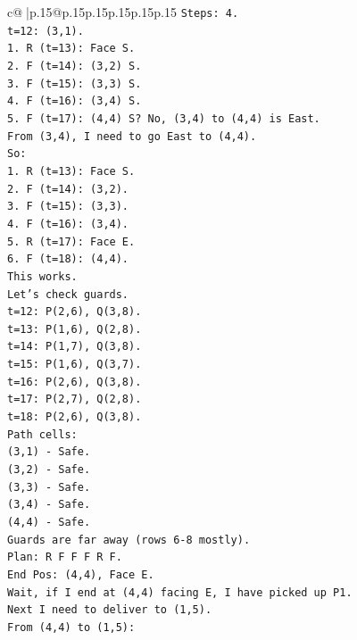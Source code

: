 \documentclass{article}
\begin{document}
{\begin{supertabular}{c@{$\;$}|p{.15\linewidth}@{}p{.15\linewidth}p{.15\linewidth}p{.15\linewidth}p{.15\linewidth}p{.15\linewidth}}
{{{\texttt{Steps: 4.} \\
\texttt{t=12: (3,1).} \\
\texttt{1. R (t=13): Face S.} \\
\texttt{2. F (t=14): (3,2) S.} \\
\texttt{3. F (t=15): (3,3) S.} \\
\texttt{4. F (t=16): (3,4) S.} \\
\texttt{5. F (t=17): (4,4) S? No, (3,4) to (4,4) is East.} \\
\texttt{From (3,4), I need to go East to (4,4).} \\
\texttt{So:} \\
\texttt{1. R (t=13): Face S.} \\
\texttt{2. F (t=14): (3,2).} \\
\texttt{3. F (t=15): (3,3).} \\
\texttt{4. F (t=16): (3,4).} \\
\texttt{5. R (t=17): Face E.} \\
\texttt{6. F (t=18): (4,4).} \\
\texttt{This works.} \\
\texttt{Let's check guards.} \\
\texttt{t=12: P(2,6), Q(3,8).} \\
\texttt{t=13: P(1,6), Q(2,8).} \\
\texttt{t=14: P(1,7), Q(3,8).} \\
\texttt{t=15: P(1,6), Q(3,7).} \\
\texttt{t=16: P(2,6), Q(3,8).} \\
\texttt{t=17: P(2,7), Q(2,8).} \\
\texttt{t=18: P(2,6), Q(3,8).} \\
\texttt{Path cells:} \\
\texttt{(3,1) {-} Safe.} \\
\texttt{(3,2) {-} Safe.} \\
\texttt{(3,3) {-} Safe.} \\
\texttt{(3,4) {-} Safe.} \\
\texttt{(4,4) {-} Safe.} \\
\texttt{Guards are far away (rows 6{-}8 mostly).} \\
\texttt{Plan: R F F F R F.} \\
\texttt{End Pos: (4,4), Face E.} \\
\texttt{Wait, if I end at (4,4) facing E, I have picked up P1.} \\
\texttt{Next I need to deliver to (1,5).} \\
\texttt{From (4,4) to (1,5):} \\
}}}
\end{supertabular}}
\end{document}
